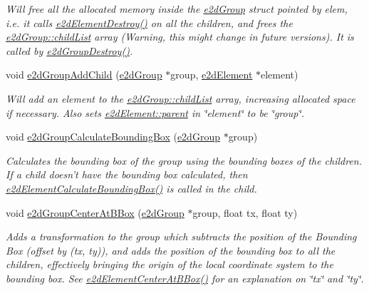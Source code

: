 \begin{DoxyCompactItemize}
\begin{DoxyCompactList}\small\item\em Will free all the allocated memory inside the \hyperlink{structe2dGroup}{e2d\-Group} struct pointed by elem, i.\-e. it calls \hyperlink{group__e2dElement_ga214c437a16fe6f3fc795539f851a2019}{e2d\-Element\-Destroy()} on all the children, and frees the \hyperlink{structe2dGroup_a55f6dde874716dc99dcd270fc0999a01}{e2d\-Group\-::child\-List} array (Warning, this might change in future versions). It is called by \hyperlink{group__e2dGroup_ga545626effa0f89b72f244e56aadb05bc}{e2d\-Group\-Destroy()}. \end{DoxyCompactList}\item 
void \hyperlink{group__e2dGroup_ga6ae76730f78ad731621e9286a3980b8a}{e2d\-Group\-Add\-Child} (\hyperlink{structe2dGroup}{e2d\-Group} $\ast$group, \hyperlink{structe2dElement}{e2d\-Element} $\ast$element)
\begin{DoxyCompactList}\small\item\em Will add an element to the \hyperlink{structe2dGroup_a55f6dde874716dc99dcd270fc0999a01}{e2d\-Group\-::child\-List} array, increasing allocated space if necessary. Also sets \hyperlink{structe2dElement_a3e62eb2fbf1d6bc6d6fe549096a6cee9}{e2d\-Element\-::parent} in \char`\"{}element\char`\"{} to be \char`\"{}group\char`\"{}. \end{DoxyCompactList}\item 
void \hyperlink{group__e2dGroup_ga7c5f43489bbd2d36a51414aee07abf5a}{e2d\-Group\-Calculate\-Bounding\-Box} (\hyperlink{structe2dGroup}{e2d\-Group} $\ast$group)
\begin{DoxyCompactList}\small\item\em Calculates the bounding box of the group using the bounding boxes of the children. If a child doesn't have the bounding box calculated, then \hyperlink{group__e2dElement_ga94aa710b2da71af2091fe4d5b87ce47e}{e2d\-Element\-Calculate\-Bounding\-Box()} is called in the child. \end{DoxyCompactList}\item 
void \hyperlink{group__e2dGroup_ga04bf94419865ca7f9d6daf30ce3fadf0}{e2d\-Group\-Center\-At\-B\-Box} (\hyperlink{structe2dGroup}{e2d\-Group} $\ast$group, float tx, float ty)
\begin{DoxyCompactList}\small\item\em Adds a transformation to the group which subtracts the position of the Bounding Box (offset by (tx, ty)), and adds the position of the bounding box to all the children, effectively bringing the origin of the local coordinate system to the bounding box. See \hyperlink{group__e2dElement_ga36b01a888c97163c990e16d348aff61c}{e2d\-Element\-Center\-At\-B\-Box()} for an explanation on \char`\"{}tx\char`\"{} and \char`\"{}ty\char`\"{}. \end{DoxyCompactList}\item 

\end{DoxyCompactItemize}
